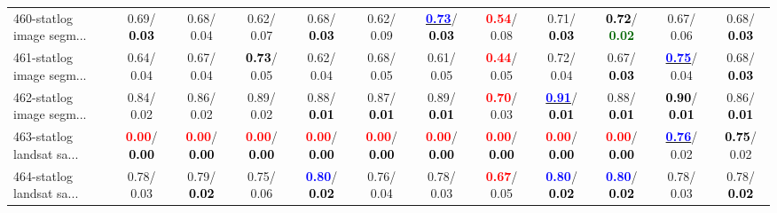 \begin{table}[h]
\begin{center}
{\begin{tabular}{lc|c|c|c|c|c|c|c|c|c|c}
460-statlog image segm... &   0.69/\textcolor{black}{\textbf{  0.03}} &   0.68/  0.04 &   0.62/  0.07 &   0.68/\textcolor{black}{\textbf{  0.03}} &   0.62/  0.09 & \underline{\textcolor{blue}{\textbf{  0.73}}}/\textcolor{black}{\textbf{  0.03}} & \textcolor{red}{\textbf{  0.54}}/  0.08 &   0.71/\textcolor{black}{\textbf{  0.03}} & \textcolor{black}{\textbf{  0.72}}/\textcolor{darkgreen}{\textbf{  0.02}} &   0.67/  0.06 &   0.68/\textcolor{black}{\textbf{  0.03}} \\
461-statlog image segm... &   0.64/  0.04 &   0.67/  0.04 & \textcolor{black}{\textbf{  0.73}}/  0.05 &   0.62/  0.04 &   0.68/  0.05 &   0.61/  0.05 & \textcolor{red}{\textbf{  0.44}}/  0.05 &   0.72/  0.04 &   0.67/\textcolor{black}{\textbf{  0.03}} & \underline{\textcolor{blue}{\textbf{  0.75}}}/  0.04 &   0.68/\textcolor{black}{\textbf{  0.03}} \\
462-statlog image segm... &   0.84/  0.02 &   0.86/  0.02 &   0.89/  0.02 &   0.88/\textcolor{black}{\textbf{  0.01}} &   0.87/\textcolor{black}{\textbf{  0.01}} &   0.89/\textcolor{black}{\textbf{  0.01}} & \textcolor{red}{\textbf{  0.70}}/  0.03 & \underline{\textcolor{blue}{\textbf{  0.91}}}/\textcolor{black}{\textbf{  0.01}} &   0.88/\textcolor{black}{\textbf{  0.01}} & \textcolor{black}{\textbf{  0.90}}/\textcolor{black}{\textbf{  0.01}} &   0.86/\textcolor{black}{\textbf{  0.01}} \\ \hline
463-statlog landsat sa... & \textcolor{red}{\textbf{  0.00}}/\textcolor{black}{\textbf{  0.00}} & \textcolor{red}{\textbf{  0.00}}/\textcolor{black}{\textbf{  0.00}} & \textcolor{red}{\textbf{  0.00}}/\textcolor{black}{\textbf{  0.00}} & \textcolor{red}{\textbf{  0.00}}/\textcolor{black}{\textbf{  0.00}} & \textcolor{red}{\textbf{  0.00}}/\textcolor{black}{\textbf{  0.00}} & \textcolor{red}{\textbf{  0.00}}/\textcolor{black}{\textbf{  0.00}} & \textcolor{red}{\textbf{  0.00}}/\textcolor{black}{\textbf{  0.00}} & \textcolor{red}{\textbf{  0.00}}/\textcolor{black}{\textbf{  0.00}} & \textcolor{red}{\textbf{  0.00}}/\textcolor{black}{\textbf{  0.00}} & \underline{\textcolor{blue}{\textbf{  0.76}}}/  0.02 & \textcolor{black}{\textbf{  0.75}}/  0.02 \\
464-statlog landsat sa... &   0.78/  0.03 &   0.79/\textcolor{black}{\textbf{  0.02}} &   0.75/  0.06 & \textcolor{blue}{\textbf{  0.80}}/\textcolor{black}{\textbf{  0.02}} &   0.76/  0.04 &   0.78/  0.03 & \textcolor{red}{\textbf{  0.67}}/  0.05 & \textcolor{blue}{\textbf{  0.80}}/\textcolor{black}{\textbf{  0.02}} & \textcolor{blue}{\textbf{  0.80}}/\textcolor{black}{\textbf{  0.02}} &   0.78/  0.03 &   0.78/\textcolor{black}{\textbf{  0.02}} \\

\end{tabular}}
\end{center}
\end{table}
